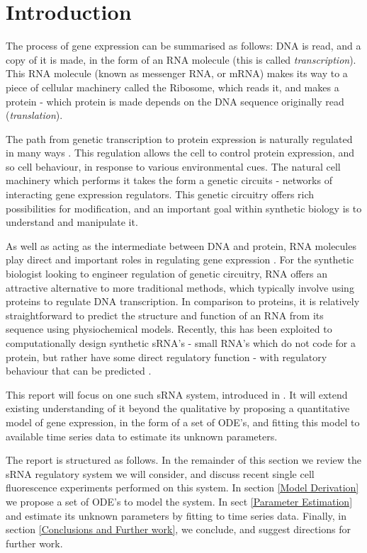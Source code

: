 \documentclass[10pt,journal]{./IEEE_latex_class/IEEEtran}
\begin{document}
\IEEEpeerreviewmaketitle




\section{Introduction}
\label{sec: Intro}
The process of gene expression can be summarised as follows: DNA is read, and a copy of it is made, in the form of an RNA molecule (this is called \textit{transcription}). This RNA molecule (known as messenger RNA, or mRNA) makes its way to a piece of cellular machinery called the Ribosome, which reads it, and makes a protein - which protein is made depends on the DNA sequence originally read (\textit{translation}).  

 The path from genetic transcription to protein expression is naturally regulated in many ways \cite{MolecularBiology}. This regulation allows the cell to control protein expression, and so cell behaviour, in response to various environmental cues. The natural cell machinery which performs it takes the form a genetic circuits - networks of interacting gene expression regulators. This genetic circuitry offers rich possibilities for modification, and an important goal within synthetic biology is to understand and manipulate it.

As well as acting as the intermediate between DNA and protein, RNA molecules play direct and important roles in regulating gene expression \cite{Isaacs2006}. For the synthetic biologist looking to engineer regulation of genetic circuitry, RNA offers an attractive alternative to more traditional methods, which typically involve using proteins to regulate DNA transcription. In comparison to proteins, it is relatively straightforward to predict the structure and function of an RNA from its sequence using physiochemical models. Recently, this has been exploited to computationally design synthetic sRNA's - small RNA's which do not code for a protein, but rather have some direct regulatory function -  with regulatory behaviour that can be predicted \cite{Rodrigo2013}\cite{Rodrigo2012}.

This report will focus on one such sRNA system, introduced in \cite{Rodrigo2012}. It will extend existing understanding of it beyond the qualitative by proposing a quantitative model of gene expression, in the form of a set of ODE's, and fitting this model to available time series data to estimate its unknown parameters.

The report is structured as follows. In the remainder of this section we review the sRNA regulatory system we will consider, and discuss recent single cell fluorescence experiments performed on this system. In section \ref{Model Derivation} we propose a set of ODE's to model the system. In sect \ref{Parameter Estimation} and estimate its unknown parameters by fitting to time series data. Finally, in section \ref{Conclusions and Further work}, we conclude, and suggest directions for further work.
\end{document}
